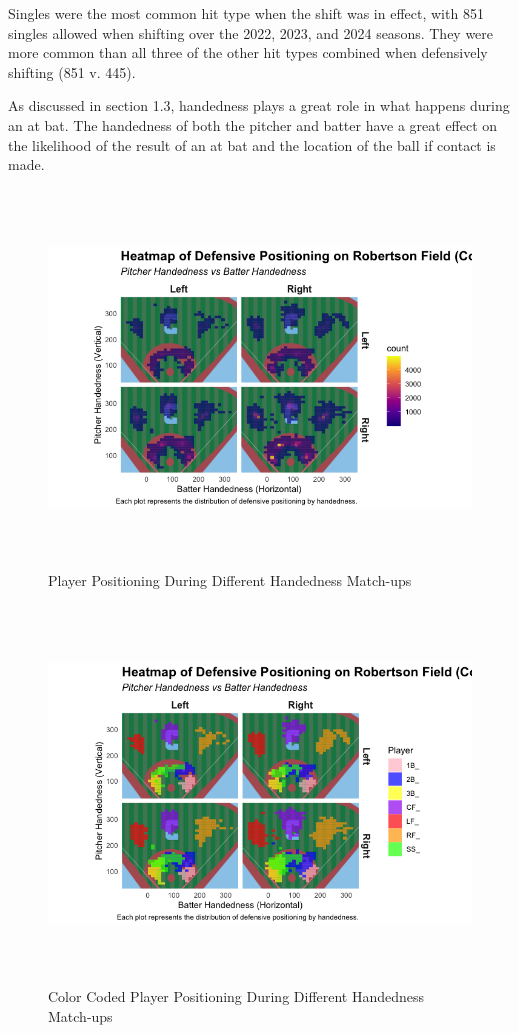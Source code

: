 \documentclass{article}
\begin{document}
Singles were the most common hit type when the shift was in effect, with 851 singles allowed when shifting over the 2022, 2023, and 2024 seasons. They were more common than all three of the other hit types combined when defensively shifting (851 v. 445). 

As discussed in section 1.3, handedness plays a great role in what happens during an at bat. The handedness of both the pitcher and batter have a great effect on the likelihood of the result of an at bat and the location of the ball if contact is made. 


\begin{figure}[h]
    \centering
    \includegraphics[height=10cm]{images/handedness_heatmap.png}
    \caption{Player Positioning During Different Handedness Match-ups}
\end{figure}


\begin{figure}[h]
    \centering
    \includegraphics[height=10cm]{images/color_coded_handedness_heatmap.png}
    \caption{Color Coded Player Positioning During Different Handedness Match-ups}
\end{figure}
\newpage
\end{document}

